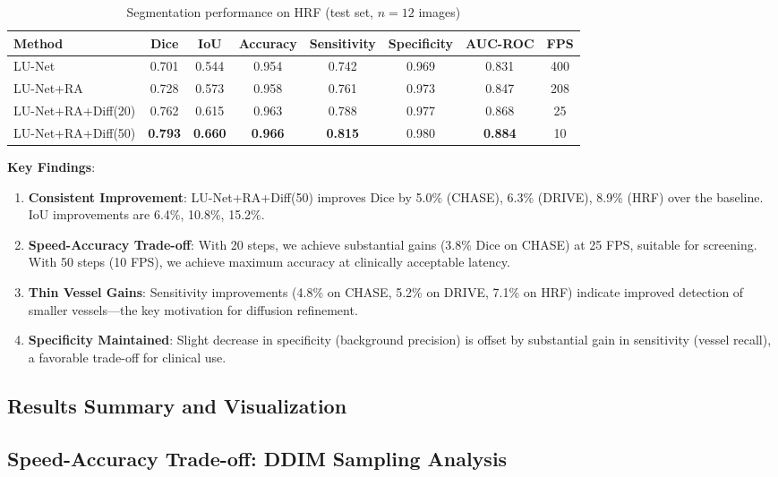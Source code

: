 \documentclass[11pt]{article}
\begin{document}
\begin{table}[H]
\centering
\caption{Segmentation performance on HRF (test set, $n=12$ images)}
\begin{tabular}{lccccccc}
\toprule
Method & Dice & IoU & Accuracy & Sensitivity & Specificity & AUC-ROC & FPS \\
\midrule
LU-Net & 0.701 & 0.544 & 0.954 & 0.742 & 0.969 & 0.831 & 400 \\
LU-Net+RA & 0.728 & 0.573 & 0.958 & 0.761 & 0.973 & 0.847 & 208 \\
LU-Net+RA+Diff(20) & 0.762 & 0.615 & 0.963 & 0.788 & 0.977 & 0.868 & 25 \\
LU-Net+RA+Diff(50) & \textbf{0.793} & \textbf{0.660} & \textbf{0.966} & \textbf{0.815} & 0.980 & \textbf{0.884} & 10 \\
\bottomrule
\end{tabular}
\label{tab:hrf_results}
\end{table}

\textbf{Key Findings}:
\begin{enumerate}
    \item \textbf{Consistent Improvement}: LU-Net+RA+Diff(50) improves Dice by 5.0\% (CHASE), 6.3\% (DRIVE), 8.9\% (HRF) over the baseline. IoU improvements are 6.4\%, 10.8\%, 15.2\%.
    
    \item \textbf{Speed-Accuracy Trade-off}: With 20 steps, we achieve substantial gains (3.8\% Dice on CHASE) at 25 FPS, suitable for screening. With 50 steps (10 FPS), we achieve maximum accuracy at clinically acceptable latency.
    
    \item \textbf{Thin Vessel Gains}: Sensitivity improvements (4.8\% on CHASE, 5.2\% on DRIVE, 7.1\% on HRF) indicate improved detection of smaller vessels—the key motivation for diffusion refinement.
    
    \item \textbf{Specificity Maintained}: Slight decrease in specificity (background precision) is offset by substantial gain in sensitivity (vessel recall), a favorable trade-off for clinical use.
\end{enumerate}

\subsection{Results Summary and Visualization}

\subsection{Speed-Accuracy Trade-off: DDIM Sampling Analysis}
\end{document}
